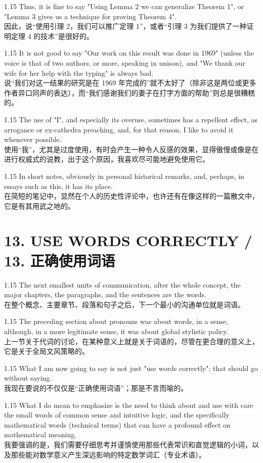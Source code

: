 \documentclass[12pt,a4paper]{article}
\newcommand{\bilingual}[2]{
    \begin{spacing}{1.15} %
        \noindent \normalsize #1 \\[-0.5ex] %
        \small \textcolor{blue!70!black}{#2} %
    \end{spacing}
    \vspace{0.8em} %
}
\begin{document}
\bilingual{Thus, it is fine to say "Using Lemma 2 we can generalize Theorem 1", or "Lemma 3 gives us a technique for proving Theorem 4".}
{因此，说“使用引理 2，我们可以推广定理 1”，或者“引理 3 为我们提供了一种证明定理 4 的技术”是很好的。} %

\bilingual{It is not good to say "Our work on this result was done in 1969" (unless the voice is that of two authors, or more, speaking in unison), and "We thank our wife for her help with the typing" is always bad.}
{说“我们对这一结果的研究是在 1969 年完成的”就不太好了（除非这是两位或更多作者异口同声的表达），而“我们感谢我们的妻子在打字方面的帮助”则总是很糟糕的。} %

\bilingual{The use of "I", and especially its overuse, sometimes has a repellent effect, as arrogance or ex-cathedra preaching, and, for that reason, I like to avoid it whenever possible.}
{使用“我”，尤其是过度使用，有时会产生一种令人反感的效果，显得傲慢或像是在进行权威式的说教，出于这个原因，我喜欢尽可能地避免使用它。} %

\bilingual{In short notes, obviously in personal historical remarks, and, perhaps, in essays such as this, it has its place.}
{在简短的笔记中，显然在个人的历史性评论中，也许还有在像这样的一篇散文中，它是有其用武之地的。} %

\section*{13. USE WORDS CORRECTLY / 13. 正确使用词语} %

\bilingual{The next smallest units of communication, after the whole concept, the major chapters, the paragraphs, and the sentences are the words.}
{在整个概念、主要章节、段落和句子之后，下一个最小的沟通单位就是词语。} %

\bilingual{The preceding section about pronouns was about words, in a sense, although, in a more legitimate sense, it was about global stylistic policy.}
{上一节关于代词的讨论，在某种意义上就是关于词语的，尽管在更合理的意义上，它是关于全局文风策略的。} %

\bilingual{What I am now going to say is not just "use words correctly"; that should go without saying.}
{我现在要说的不仅仅是“正确使用词语”；那是不言而喻的。} %

\bilingual{What I do mean to emphasize is the need to think about and use with care the small words of common sense and intuitive logic, and the specifically mathematical words (technical terms) that can have a profound effect on mathematical meaning.}
{我要强调的是，我们需要仔细思考并谨慎使用那些代表常识和直觉逻辑的小词，以及那些能对数学意义产生深远影响的特定数学词汇（专业术语）。} %
\end{document}
